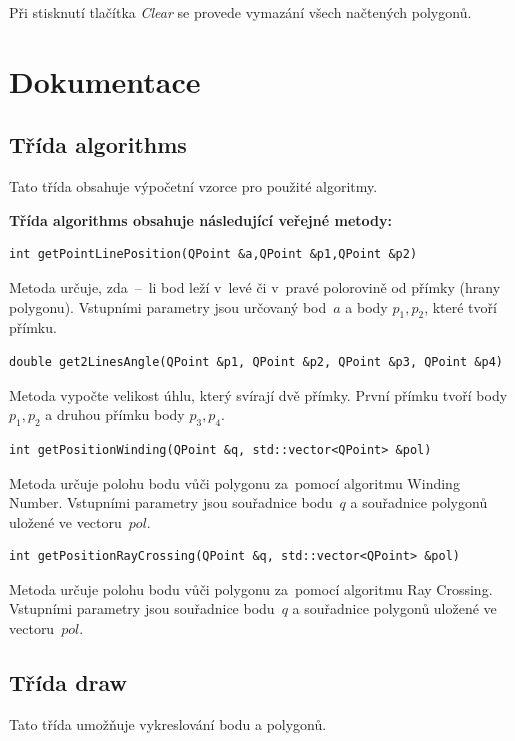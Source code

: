 \documentclass[a4paper, 12pt, oneside, titlepage]{article} %
\begin{document}
Při stisknutí tlačítka \emph{Clear} se provede vymazání všech načtených polygonů.

\section*{Dokumentace}
\subsection*{Třída algorithms}
Tato třída obsahuje výpočetní vzorce pro použité algoritmy.

\textbf{Třída algorithms obsahuje následující veřejné metody:}
\begin{verbatim}
int getPointLinePosition(QPoint &a,QPoint &p1,QPoint &p2)
\end{verbatim}
Metoda určuje, zda~--~li bod leží v~levé či v~pravé polorovině od přímky (hrany polygonu). Vstupními parametry jsou určovaný bod~$a$ a body $p_1, p_2$, které tvoří přímku.\\

\begin{verbatim}
double get2LinesAngle(QPoint &p1, QPoint &p2, QPoint &p3, QPoint &p4)
\end{verbatim}
Metoda vypočte velikost úhlu, který svírají dvě přímky. První přímku tvoří body $p_1, p_2$ a druhou přímku body $p_3, p_4$.\\

\begin{verbatim}
int getPositionWinding(QPoint &q, std::vector<QPoint> &pol)
\end{verbatim}
Metoda určuje polohu bodu vůči polygonu za~pomocí algoritmu Winding Number. Vstupními parametry jsou souřadnice bodu~$q$ a souřadnice polygonů uložené ve vectoru~$pol$.\\

\begin{verbatim}
int getPositionRayCrossing(QPoint &q, std::vector<QPoint> &pol)
\end{verbatim}
Metoda určuje polohu bodu vůči polygonu za~pomocí algoritmu Ray Crossing. Vstupními parametry jsou souřadnice bodu~$q$ a souřadnice polygonů uložené ve vectoru~$pol$.

\subsection*{Třída draw}
Tato třída umožňuje vykreslování bodu a polygonů.
\end{document}

